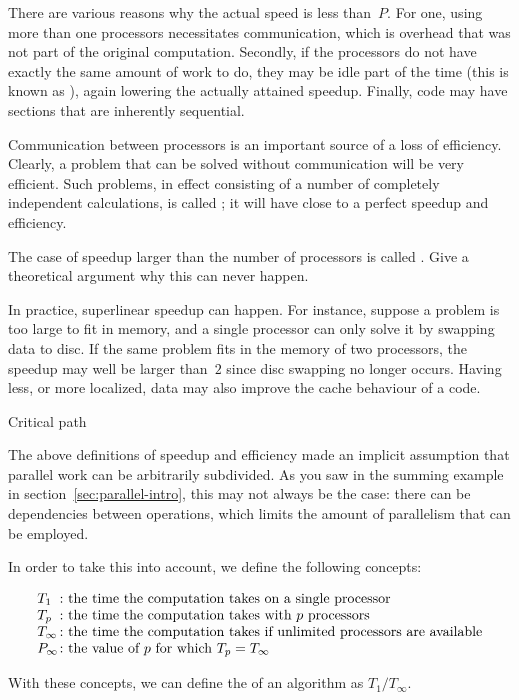 There are various reasons why the actual speed is less than~$P$. For
one, using more than one processors necessitates communication, which
is overhead that was not part of the original computation. Secondly,
if the processors do not have exactly the same amount of work to do,
they may be idle part of the time (this is known as
), again lowering the actually attained
speedup. Finally, code may have sections that are inherently
sequential.

Communication between processors is an important source of a loss of
efficiency. Clearly, a problem that can be solved without
communication will be very efficient. Such problems, in effect
consisting of a number of completely independent calculations, is
called ; it will have close to a perfect
speedup and efficiency.

\begin{exercise}
  The case of speedup larger than the number of processors is called
  . Give a theoretical argument why
  this can never happen.
\end{exercise}

In practice, superlinear speedup can happen. For instance, suppose a 
problem is too large to fit in memory, and a single processor can only
solve it by swapping data to disc. If the same problem fits in the
memory of two processors, the speedup may well be larger than~$2$
since disc swapping no longer occurs. Having less, or more localized,
data may also improve the cache behaviour of a code.

 {Critical path}
\label{sec:critical-path}

The above definitions of speedup and efficiency made an implicit assumption
that parallel work can be arbitrarily subdivided.
As you saw in the summing example in section~\ref{sec:parallel-intro},
this may not always be the case: there can be dependencies between
operations, which limits the amount of parallelism that can be
employed.

In order to take this into account, we define the following concepts:
\begin{definition}
  \[ 
  \begin{array}{l@{\colon}l}
    T_1&\hbox{the time the computation takes on a single processor}\\
    T_p&\hbox{the time the computation takes with $p$ processors}\\
    T_\infty&\hbox{the time the computation takes if unlimited processors are available}\\
    P_\infty&\hbox{the value of $p$ for which $T_p=T_\infty$}
  \end{array}  
  \]
\end{definition}
With these concepts, we can define the 
of an algorithm as $T_1/T_\infty$.

